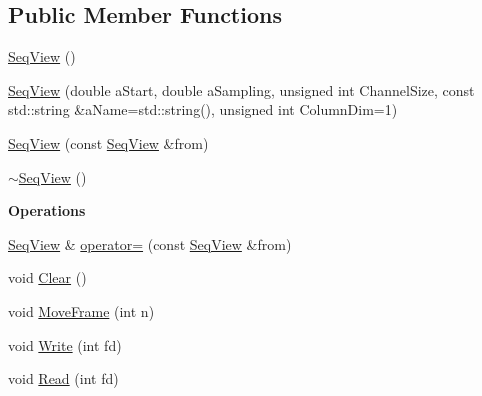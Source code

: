 \subsection*{Public Member Functions}
\begin{DoxyCompactItemize}
\item 
\hyperlink{classtsa_1_1_seq_view_ad5d0fa3c39a124fec0c4b4711f1f621c}{Seq\+View} ()
\item 
\hyperlink{classtsa_1_1_seq_view_aee8aba59ff1ffae588b594b055ad3dc7}{Seq\+View} (double a\+Start, double a\+Sampling, unsigned int Channel\+Size, const std\+::string \&a\+Name=std\+::string(), unsigned int Column\+Dim=1)
\item 
\hyperlink{classtsa_1_1_seq_view_aebaf0de2a3d001035e64878b75b336c2}{Seq\+View} (const \hyperlink{classtsa_1_1_seq_view}{Seq\+View} \&from)
\item 
\hyperlink{classtsa_1_1_seq_view_a92d9c5d9ae07e3b648469cf2a642b813}{$\sim$\+Seq\+View} ()
\end{DoxyCompactItemize}
\begin{Indent}\textbf{ Operations}\par
\begin{DoxyCompactItemize}
\item 
\hyperlink{classtsa_1_1_seq_view}{Seq\+View} \& \hyperlink{classtsa_1_1_seq_view_ad7232128a9c94111d4f2ef1d02da7c55}{operator=} (const \hyperlink{classtsa_1_1_seq_view}{Seq\+View} \&from)
\item 
void \hyperlink{classtsa_1_1_seq_view_a9986aecca8deb9ce3c8666bb4c700536}{Clear} ()
\item 
void \hyperlink{classtsa_1_1_seq_view_aa8e6396dfafee7ef74d686ca57bd73b9}{Move\+Frame} (int n)
\item 
void \hyperlink{classtsa_1_1_seq_view_a018ca56daa37e8b8ae58c8cc978ddc9b}{Write} (int fd)
\item 
void \hyperlink{classtsa_1_1_seq_view_a9fad44013de1bc3898d0ba8dc0f21481}{Read} (int fd)
\end{DoxyCompactItemize}
\end{Indent}
